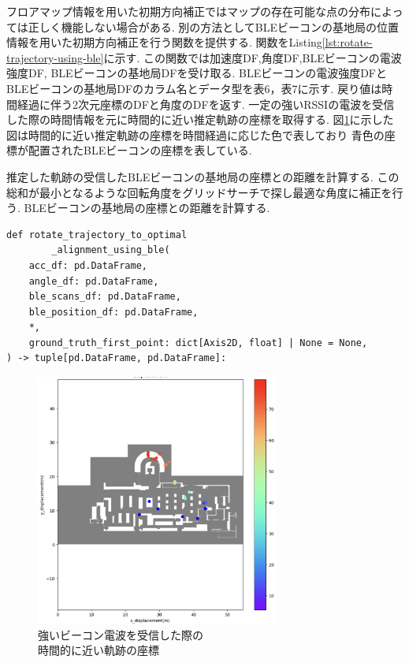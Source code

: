 フロアマップ情報を用いた初期方向補正ではマップの存在可能な点の分布によっては正しく機能しない場合がある.
別の方法としてBLEビーコンの基地局の位置情報を用いた初期方向補正を行う関数を提供する.
関数をListing\ref{lst:rotate-trajectory-using-ble}に示す.
この関数では加速度DF,角度DF,BLEビーコンの電波強度DF, BLEビーコンの基地局DFを受け取る.
BLEビーコンの電波強度DFとBLEビーコンの基地局DFのカラム名とデータ型を表6，表7に示す.
戻り値は時間経過に伴う2次元座標のDFと角度のDFを返す.
一定の強いRSSIの電波を受信した際の時間情報を元に時間的に近い推定軌跡の座標を取得する.
図\ref{fig:ble-merge}に示した図は時間的に近い推定軌跡の座標を時間経過に応じた色で表しており
青色の座標が配置されたBLEビーコンの座標を表している.

推定した軌跡の受信したBLEビーコンの基地局の座標との距離を計算する.
この総和が最小となるような回転角度をグリッドサーチで探し最適な角度に補正を行う.
BLEビーコンの基地局の座標との距離を計算する.

\begin{lstlisting}[caption={BLEビーコンの基地局の位置情報を使用した初期方向補正}, label=lst:rotate-trajectory-using-ble]
def rotate_trajectory_to_optimal
		_alignment_using_ble(
    acc_df: pd.DataFrame,
    angle_df: pd.DataFrame,
    ble_scans_df: pd.DataFrame,
    ble_position_df: pd.DataFrame,
    *,
    ground_truth_first_point: dict[Axis2D, float] | None = None,
) -> tuple[pd.DataFrame, pd.DataFrame]:
\end{lstlisting}

\begin{figure}[h]
	\centering
	\includegraphics[width=80mm]{image/ble-merge.jpg}
	\caption{強いビーコン電波を受信した際の\\時間的に近い軌跡の座標}    \label{fig:ble-merge}
\end{figure}

